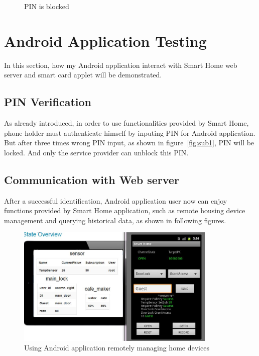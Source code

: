\begin{figure}[!htb]
\begin{minipage}{0.49\linewidth}
  \caption{PIN is blocked}
  \label{fig:sub2}
\end{minipage}
  \end{figure}
\section{Android Application Testing}
In this section, how my Android application interact with Smart Home web server and smart card applet will be demonstrated.

\subsection{PIN Verification}

As already introduced, in order to use functionalities provided by Smart Home, phone holder must authenticate himself by inputing PIN for Android application. But after three times wrong PIN input, as shown in figure~\ref{fig:sub1}, PIN will be locked. And only the service provider can unblock this PIN. 
\subsection{Communication with Web server}
After a successful identification, Android application user now can enjoy functions provided by Smart Home application, such as remote housing device management and querying historical data, as shown in following figures.

\begin{figure}[!htb]
	\centering
	\includegraphics[width=0.85\textwidth]{Images/impl/housing-device.jpg}
		\caption{Using Android application remotely managing home devices}
	\label{fig:housing-device}
\end{figure}

